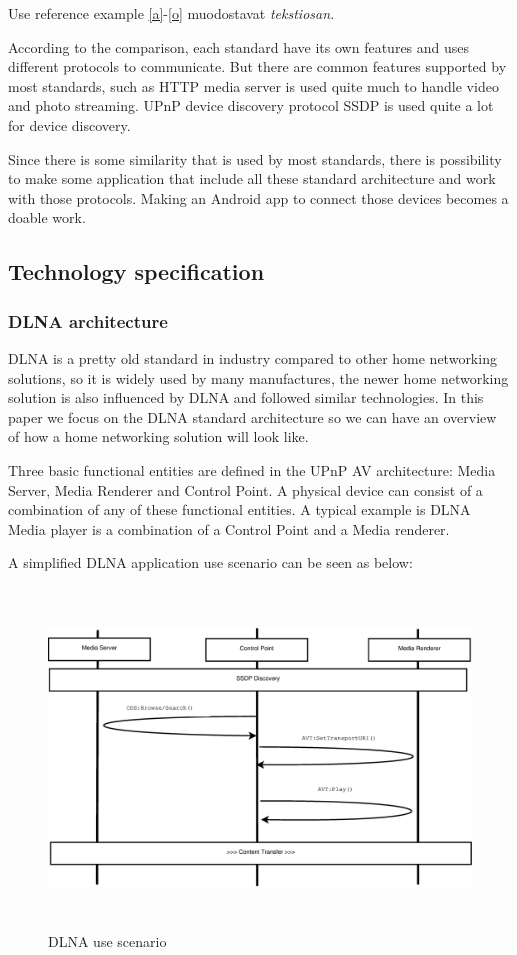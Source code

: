 Use reference example \ref{a}-\ref{o} muodostavat \textit{tekstiosan.}  

According to the comparison, each standard have its own features and uses different protocols to communicate. But there are common features supported by most standards, such as HTTP media server is used quite much to handle video and photo streaming. UPnP device discovery protocol SSDP is used quite a lot for device discovery. 

Since there is some similarity that is used by most standards, there is possibility to make some application that include all these standard architecture and work with those protocols. Making an Android app to connect those devices becomes a doable work.

\subsection*{Technology specification}
\subsubsection*{DLNA architecture}
DLNA is a pretty old standard in industry compared to other home networking solutions, so it is widely used by many manufactures, the newer home networking solution is also influenced by DLNA and followed similar technologies. In this paper we focus on the DLNA standard architecture so we can have an overview of how a home networking solution will look like.

Three basic functional entities are defined in the UPnP AV architecture: Media Server, Media Renderer and Control Point. A physical device can consist of a combination of any of these functional entities. A typical example is DLNA Media player is a combination of a Control Point and a Media renderer.

A simplified DLNA application use scenario can be seen as below:

\begin{figure}[htb]
\centering \includegraphics[height=9cm]{charts/chart1}
\caption{DLNA use scenario \label{chart1}}
\end{figure}

